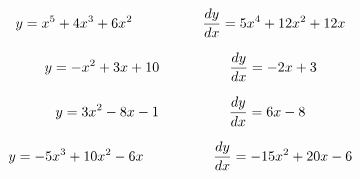 $$y = x^5 + 4x^3 + 6x^2 \hbox{\hskip 50pt} {dy \over dx} = 5x^4 + 12x^2 + 12x$$

\vskip 20pt

$$y = -x^2 + 3x + 10 \hbox{\hskip 50pt} {dy \over dx} = -2x + 3$$

\vskip 20pt

$$y = 3x^2 - 8x - 1 \hbox{\hskip 50pt} {dy \over dx} = 6x - 8$$

\vskip 20pt

$$y = -5x^3 + 10x^2 - 6x \hbox{\hskip 50pt} {dy \over dx} = -15x^2 + 20x - 6$$












